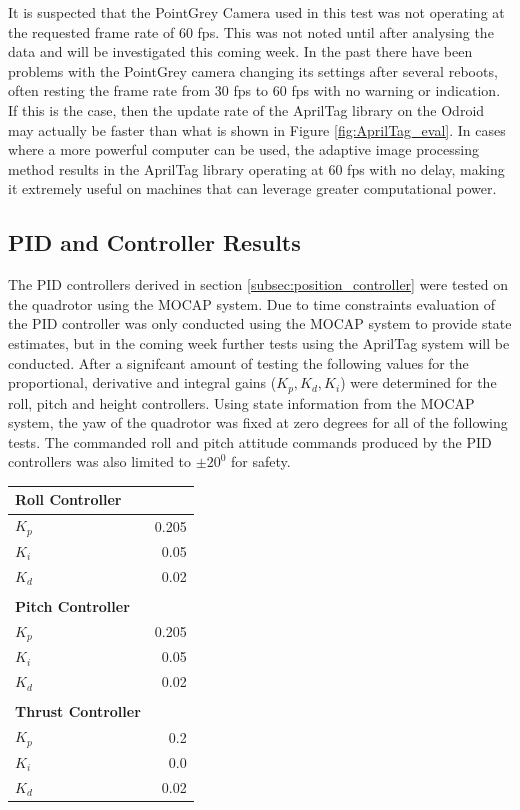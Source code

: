 \documentclass[11pt, twocolumn]{article}
\begin{document}
It is suspected that the PointGrey Camera used in this test was not operating at the requested frame rate of 60 fps. This was not noted until after analysing the data and will be investigated this coming week. In the past there have been problems with the PointGrey camera changing its settings after several reboots, often resting the frame rate from 30 fps to 60 fps with no warning or indication. If this is the case, then the update rate of the AprilTag library on the Odroid may actually be faster than what is shown in Figure \ref{fig:AprilTag_eval}. In cases where a more powerful computer can be used, the adaptive image processing method results in the AprilTag library operating at 60 fps with no delay, making it extremely useful on machines that can leverage greater computational power. 

\subsection{PID and Controller Results}
The PID controllers derived in section \ref{subsec:position_controller} were tested on the quadrotor using the MOCAP system. Due to time constraints evaluation of the PID controller was only conducted using the MOCAP system to provide state estimates, but in the coming week further tests using the AprilTag system will be conducted. After a signifcant amount of testing the following values for the proportional, derivative and integral gains ($K_p, K_d, K_i$) were determined for the roll, pitch and height controllers. Using state information from the MOCAP system, the yaw of the quadrotor was fixed at zero degrees for all of the following tests. The commanded roll and pitch attitude commands produced by the PID controllers was also limited to $\pm 20^0$ for safety. 

\begin{center} 
	\vspace{-0.4cm}
	\begin{tabular}{l r}
		\hline
		\textbf{Roll Controller} \\
		\hline
		$K_{p}$ &  0.205 \\
		$K_{i}$ & 0.05 \\
		$K_{d}$ &  0.02 \\
		\\
		\hline
		\textbf{Pitch Controller} \\
		\hline
		$K_{p}$ & 0.205 \\
		$K_{i}$ & 0.05 \\
		$K_{d}$ & 0.02 \\
		\\
		\hline
		\textbf{Thrust Controller} \\
		\hline
		$K_{p}$ & 0.2 \\
		$K_{i}$ & 0.0 \\
		$K_{d}$ & 0.02 \\
	\end{tabular}
\end{center}
\end{document}
